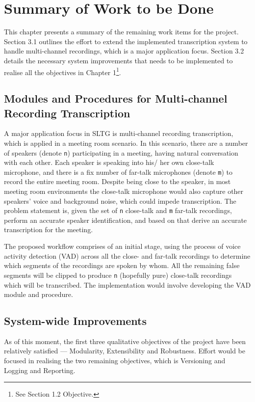 \chapter{Summary of Work to be Done}

This chapter presents a summary of the remaining work items for the project. Section 3.1 outlines the effort to extend the implemented transcription system to handle multi-channel recordings, which is a major application focus. Section 3.2 details the necessary system improvements that needs to be implemented to realise all the objectives in Chapter 1\footnote{See Section 1.2 Objective.}.

\section{Modules and Procedures for Multi-channel Recording Transcription}

A major application focus in SLTG is multi-channel recording transcription, which is applied in a meeting room scenario. In this scenario, there are a number of speakers (denote \texttt{n}) participating in a meeting, having natural conversation with each other. Each speaker is speaking into his/ her own close-talk microphone, and there is a fix number of far-talk microphones (denote \texttt{m}) to record the entire meeting room. Despite being close to the speaker, in most meeting room environments the close-talk microphone would also capture other speakers' voice and background noise, which could impede transcription. The problem statement is, given the set of \texttt{n} close-talk and \texttt{m} far-talk recordings, perform an accurate speaker identification, and based on that derive an accurate transcription for the meeting.

The proposed workflow comprises of an initial stage, using the process of voice activity detection (VAD) across all the close- and far-talk recordings to determine which segments of the recordings are spoken by whom. All the remaining false segments will be clipped to produce \texttt{n} (hopefully pure) close-talk recordings which will be transcribed. The implementation would involve developing the VAD module and procedure.

\section{System-wide Improvements}

As of this moment, the first three qualitative objectives of the project have been relatively satisfied --- Modularity, Extensibility and Robustness. Effort would be focused in realising the two remaining objectives, which is Versioning and Logging and Reporting.

